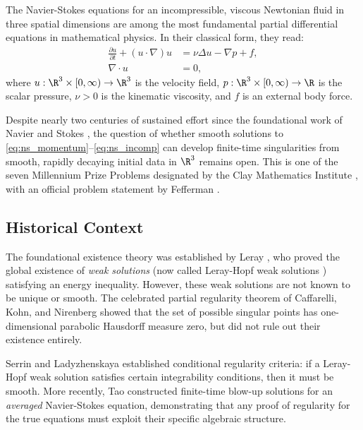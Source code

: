 \documentclass[12pt, a4paper]{article}
\theoremstyle{plain}
\theoremstyle{definition}
\begin{document}
The Navier-Stokes equations for an incompressible, viscous Newtonian fluid
in three spatial dimensions are among the most fundamental partial differential
equations in mathematical physics. In their classical form, they read:
\begin{align}
  \frac{\partial u}{\partial t} + (u \cdot \nabla)u &= \nu \Delta u - \nabla p + f,
  \label{eq:ns_momentum} \\
  \nabla \cdot u &= 0,
  \label{eq:ns_incomp}
\end{align}
where $u: \R^3 \times [0,\infty) \to \R^3$ is the velocity field,
$p: \R^3 \times [0,\infty) \to \R$ is the scalar pressure,
$\nu > 0$ is the kinematic viscosity, and $f$ is an external body force.

Despite nearly two centuries of sustained effort since the foundational work
of Navier \citep{Navier1822} and Stokes \citep{Stokes1845}, the question of
whether smooth solutions to \eqref{eq:ns_momentum}--\eqref{eq:ns_incomp}
can develop finite-time singularities from smooth, rapidly decaying initial data
in $\R^3$ remains open. This is one of the seven Millennium Prize Problems
designated by the Clay Mathematics Institute \citep{ClayNS}, with an official
problem statement by Fefferman \citep{Fefferman2006}.

\subsection{Historical Context}

The foundational existence theory was established by Leray \citep{Leray1934},
who proved the global existence of \emph{weak solutions} (now called Leray-Hopf
weak solutions \citep{Hopf1951}) satisfying an energy inequality. However,
these weak solutions are not known to be unique or smooth. The celebrated
partial regularity theorem of Caffarelli, Kohn, and Nirenberg \citep{CKN1982}
showed that the set of possible singular points has one-dimensional parabolic
Hausdorff measure zero, but did not rule out their existence entirely.

Serrin \citep{LadyzhenskayaSerrin1967} and Ladyzhenskaya \citep{Ladyzhenskaya1969}
established conditional regularity criteria: if a Leray-Hopf weak solution
satisfies certain integrability conditions, then it must be smooth. More recently,
Tao \citep{Tao2016} constructed finite-time blow-up solutions for an
\emph{averaged} Navier-Stokes equation, demonstrating that any proof of
regularity for the true equations must exploit their specific algebraic structure.
\end{document}

